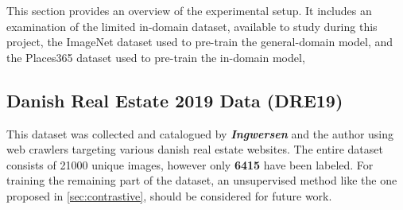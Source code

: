 This section provides an overview of the experimental setup. It includes an examination of the limited in-domain dataset, available to study during this project, the ImageNet dataset used to pre-train the general-domain model, and the Places365 dataset used to pre-train the in-domain model,
\subsection{Danish Real Estate 2019 Data (DRE19)}\label{sec:DRE19}
This dataset was collected and catalogued by \textbf{\textit{Ingwersen}}\autocite{Ingwersen} and the author using web crawlers targeting various danish real estate websites.
The entire dataset consists of 21000 unique images, however only \textbf{6415} have been labeled. For training the remaining part of the dataset, an unsupervised method like the one proposed in \autoref{sec:contrastive}, should be considered for future work.
